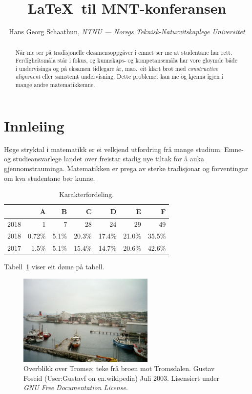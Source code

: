 \documentclass[nynorsk]{mnt}
\title{\LaTeX\ til MNT-konferansen}
\author{Hans Georg Schaathun,
\emph{NTNU --- Noregs Teknisk-Naturvitskaplege Universitet}}
\begin{document}
\maketitle

\begin{abstract}
   Når me ser på tradisjonelle eksamensoppgåver i emnet ser me at 
   studentane har rett. Ferdigheitsmåla står i fokus, og kunnskaps-
   og kompetansemåla har vore gløymde både i undervisinga og på
   eksamen tidlegare år, mao.\ eit klart brot med 
   \emph{constructive alignment} \citep{biggs11a} 
   eller samstemt undervisning.
   Dette problemet kan me òg kjenna igjen i mange andre matematikkemne.
\end{abstract}

\section{Innleiing}

Høge stryktal i matematikk er ei velkjend utfordring frå mange studium.
Emne- og studieansvarlege landet over freistar 
stadig nye tiltak for å auka gjennomstrauminga.
Matematikken er prega av sterke tradisjonar og forventingar om kva
studentane bør kunne.

\begin{table}
\centering
  \caption{Karakterfordeling.}
  \begin{tabular}{l|r|r|r|r|r|r|}
  & A & B & C & D & E & F \\
  \hline
  2018 & 1 & 7 & 28 & 24 & 29 & 49 \\
  \hline
  2018 &
  \num{0.72}\% &
  \num{5.1}\% &
  \num{20.3}\% &
  \num{17.4}\% &
  \num{21.0}\% &
  \num{35.5}\%  \\
  \hline
  2017 &
  \num{1.5}\% &
  \num{5.1}\% &
  \num{15.4}\% &
  \num{14.7}\% &
  \num{20.6}\% &
  \num{42.6}\% \\
  \hline
  \end{tabular}
  \label{tab:grade}
\end{table}


Tabell~\ref{tab:grade} viser eit døme på tabell.

\begin{figure}
\begin{center}
  \includegraphics[width=0.6\textwidth]{tromso}
\end{center}
  \caption{Overblikk over Tromsø; teke frå broen mot Tromsdalen.
    Gustav Foseid (User:Gustavf on en.wikipedia)
    Juli 2003.
    Lisensiert under \emph{GNU Free Documentation License}.
    }
  \label{fig}
\end{figure}
\end{document}
